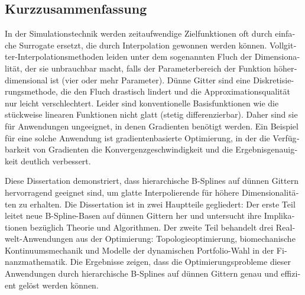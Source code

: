 \begin{otherlanguage}{ngerman}
  \disableornamentsfornextheadingtrue
  \section*{Kurzzusammenfassung}
  
  In der Simulationstechnik werden zeitaufwendige Zielfunktionen
  oft durch einfache Surrogate ersetzt, die durch Interpolation
  gewonnen werden können.
  Vollgitter-Interpola\-tions\-methoden leiden unter dem
  sogenannten Fluch der Dimensionalität,
  der sie unbrauchbar macht, falls der Parameterbereich der Funktion
  höherdimensional ist (vier oder mehr Parameter).
  Dünne Gitter sind eine Diskretisierungsmethode, die den Fluch drastisch
  lindert und die Approximationsqualität nur leicht verschlechtert.
  Leider sind konventionelle Basisfunktionen wie die stückweise
  linearen Funktionen nicht glatt (stetig differenzierbar).
  Daher sind sie für Anwendungen ungeeignet, in denen Gradienten
  benötigt werden.
  Ein Beispiel für eine solche Anwendung ist gradientenbasierte Optimierung,
  in der die Verfügbarkeit von Gradienten die Konvergenzgeschwindigkeit und
  die Ergebnisgenauigkeit deutlich verbessert.
  
  Diese Dissertation demonstriert, dass hierarchische B-Splines auf
  dünnen Gittern hervorragend geeignet sind,
  um glatte Interpolierende für höhere Dimensionalitäten zu erhalten.
  Die Dissertation ist in zwei Hauptteile gegliedert:
  Der erste Teil leitet neue B-Spline-Basen auf dünnen Gittern her und
  untersucht ihre Implikationen bezüglich Theorie und Algorithmen.
  Der zweite Teil behandelt drei Realwelt-Anwendungen aus der Optimierung:
  Topologieoptimierung, biomechanische Kontinuumsmechanik und
  Modelle der dynamischen Portfolio-Wahl in der Finanzmathematik.
  Die Ergebnisse zeigen, dass die Optimierungsprobleme dieser
  Anwendungen durch hierarchische B-Splines auf dünnen Gittern
  genau und effizient gelöst werden können.
\end{otherlanguage}

\cleardoublepage
